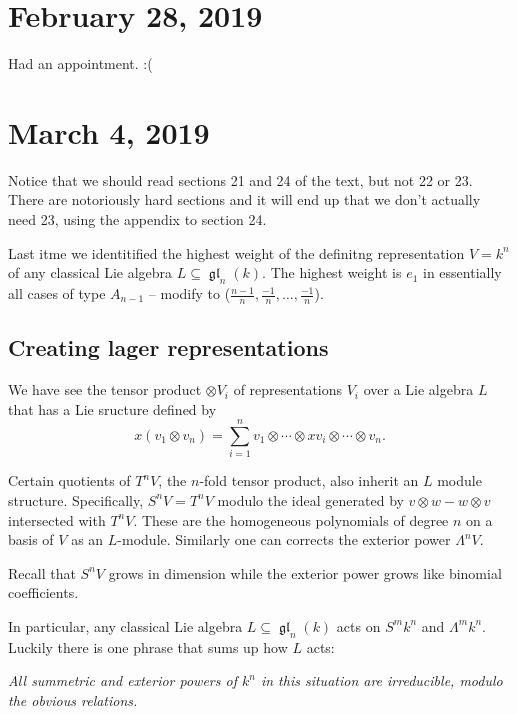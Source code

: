 \documentclass[12pt]{article}
\theoremstyle{nonumberbreak}
\theoremstyle{changebreak}
\theoremstyle{nonumberbreak}
\theoremstyle{change}
\DeclareMathOperator{\gl}{\mathfrak{gl}}
\begin{document}
\section{February 28, 2019}
Had an appointment. :(

\section{March 4, 2019}
Notice that we should read sections 21 and 24 of the text, but not 22 or 23. There are notoriously hard sections and it will end 
up that we don't actually need 23, using the appendix to section 24.

Last itme we identitified the highest weight of the definitng representation $V=k^n$ of any classical Lie algebra
$L\subseteq \gl_n(k)$. The highest weight is $e_1$ in essentially all cases of type $A_{n-1}$ -- modify to
($\frac{n-1}{n},\frac{-1}{n},\dots, \frac{-1}{n}$).

\subsection{Creating lager representations}
We have see the tensor product $\otimes V_i$ of representations $V_i$ over a Lie algebra $L$ that has a Lie sructure defined by 
\[x(v_1\otimes v_n)=\sum_{i=1}^nv_1\otimes\cdots\otimes xv_i\otimes\cdots\otimes v_n.\]

Certain quotients of $T^nV$, the $n$-fold tensor product, also inherit an $L$ module structure. Specifically, $S^nV=T^nV$ modulo
the ideal generated by $v\otimes w-w\otimes v$ intersected with $T^nV$. These are the homogeneous polynomials of degree $n$ on a basis of $V$
as an $L$-module. Similarly one can corrects the exterior power $\Lambda^nV$.

Recall that $S^nV$ grows in dimension while the exterior power grows like binomial coefficients.

In particular, any classical Lie algebra $L\subseteq\gl_n(k)$ acts on $S^mk^n$ and $\Lambda^mk^n$. Luckily
there is one phrase that sums up how $L$ acts:

\textit{All summetric and exterior powers of $k^n$ in this situation are irreducible, modulo the obvious relations.}
\end{document}
